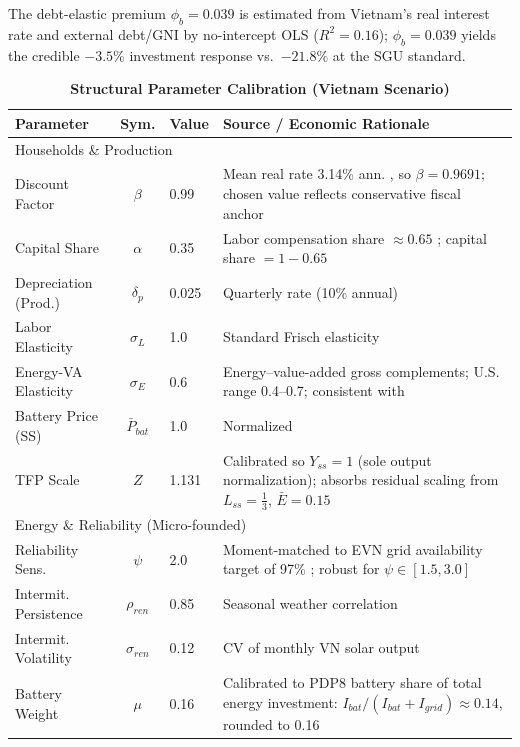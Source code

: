 	The debt-elastic premium $\phi_b = 0.039$ is estimated from Vietnam's real interest rate and external debt/GNI \citep{worldbank2024} by no-intercept OLS ($R^2 = 0.16$); $\phi_b = 0.039$ yields the credible $-3.5\%$ investment response vs.\ $-21.8\%$ at the SGU standard.

	\begin{table}[H]
		\centering
		\caption[Structural Parameter Calibration (Vietnam Scenario)]{\textbf{Structural Parameter Calibration (Vietnam Scenario)}}
		\label{tab:calibration}
		\renewcommand{\arraystretch}{1.3}
		\small
		\begin{tabular}{l c l p{6.5cm}}
			\toprule
			\textbf{Parameter} & \textbf{Sym.} & \textbf{Value} & \textbf{Source / Economic Rationale} \\
			\midrule
			\multicolumn{4}{l}{Households \& Production} \\
			Discount Factor & $\beta$ & 0.99 & Mean real rate 3.14\% ann. \citep{worldbank2024}, so $\beta = 0.9691$; chosen value reflects conservative fiscal anchor \\
			Capital Share & $\alpha$ & 0.35 & Labor compensation share $\approx 0.65$ \citep{gso2024}; capital share $= 1 - 0.65$ \\
			Depreciation (Prod.) & $\delta_p$ & 0.025 & Quarterly rate (10\% annual) \\
			Labor Elasticity & $\sigma_L$ & 1.0 & Standard Frisch elasticity \\
			Energy-VA Elasticity & $\sigma_E$ & 0.6 & Energy--value-added gross complements; \citep{heutel2012} U.S. range 0.4--0.7; consistent with \citep{iea2023} \\
			Battery Price (SS) & $\bar{P}_{bat}$ & 1.0 & Normalized \\
			TFP Scale & $Z$ & 1.131 & Calibrated so $Y_{ss}=1$ (sole output normalization); absorbs residual scaling from $L_{ss}=\tfrac{1}{3}$, $\bar{E}=0.15$ \\
			\midrule
			\multicolumn{4}{l}{Energy \& Reliability (Micro-founded)} \\
			Reliability Sens. & $\psi$ & 2.0 & Moment-matched to EVN grid availability target of 97\% \citep{evn2023}; robust for $\psi \in [1.5, 3.0]$ \\
			Intermit. Persistence & $\rho_{ren}$ & 0.85 & Seasonal weather correlation \citep{iea2023} \\
			Intermit. Volatility & $\sigma_{ren}$ & 0.12 & CV of monthly VN solar output \citep{gso2024,iea2023} \\
			Battery Weight & $\mu$ & 0.16 & Calibrated to PDP8 battery share of total energy investment: $I_{bat}/(I_{bat}+I_{grid}) \approx 0.14$, rounded to 0.16 \\

\end{tabular}
\end{table}
